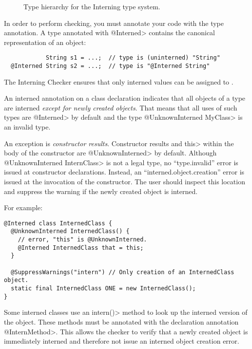 \begin{figure}
\caption{Type hierarchy for the Interning type system.}
\label{fig-interning-hierarchy}
\end{figure}

In order to perform checking, you must annotate your code with the 
type annotation.  A type annotated with \<@Interned> contains the canonical
representation of an
object:

\begin{smaller}
\begin{Verbatim}
            String s1 = ...;  // type is (uninterned) "String"
  @Interned String s2 = ...;  // type is "@Interned String"
\end{Verbatim}
\end{smaller}

The Interning Checker ensures that only interned
values can be assigned to .


An interned annotation on a class declaration indicates that all objects of a
type are interned \textit{except for newly created objects}. That means that
all uses of such types are \<@Interned> by default and the type \<@UnknownInterned
MyClass> is an invalid type.

An exception is \textit{constructor results}. Constructor results and \<this> within the
body of the constructor are \<@UnknownInterned> by default. Although \<@UnknownInterned InternClass>
is not a legal type, no ``type.invalid'' error is issued at constructor declarations.
Instead, an ``interned.object.creation''
error is issued at the invocation of the constructor. The user should inspect
this location and suppress the warning if the newly created object is interned.

For example:

\begin{Verbatim}
@Interned class InternedClass {
  @UnknownInterned InternedClass() {
    // error, "this" is @UnknownInterned.
    @Interned InternedClass that = this;
  }

  @SuppressWarnings("intern") // Only creation of an InternedClass object.
  static final InternedClass ONE = new InternedClass();
}
\end{Verbatim}

Some interned classes use an \<intern()> method to look up the interned version of
the object. These methods must be annotated with the declaration annotation
\<@InternMethod>. This allows the checker to verify that a newly created object
is immediately interned and therefore not issue an interned object creation
error.

